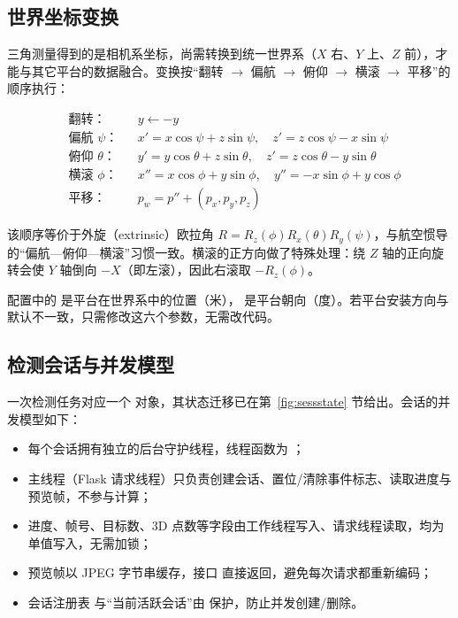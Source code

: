 \subsection{世界坐标变换}

三角测量得到的是相机系坐标，尚需转换到统一世界系（$X$ 右、$Y$ 上、$Z$ 前），才能与其它平台的数据融合。变换按“翻转 $\rightarrow$ 偏航 $\rightarrow$ 俯仰 $\rightarrow$ 横滚 $\rightarrow$ 平移”的顺序执行：

\begin{equation}
\begin{aligned}
&\text{翻转：} && y \leftarrow -y\\
&\text{偏航 } \psi\text{：} && x' = x\cos\psi + z\sin\psi,\quad z' = z\cos\psi - x\sin\psi\\
&\text{俯仰 } \theta\text{：} && y' = y\cos\theta + z\sin\theta,\quad z' = z\cos\theta - y\sin\theta\\
&\text{横滚 } \phi\text{：} && x'' = x\cos\phi + y\sin\phi,\quad y'' = -x\sin\phi + y\cos\phi\\
&\text{平移：} && p_w = p'' + (p_x,p_y,p_z)
\end{aligned}
\end{equation}

该顺序等价于外旋（extrinsic）欧拉角 $R=R_z(\phi)R_x(\theta)R_y(\psi)$，与航空惯导的“偏航—俯仰—横滚”习惯一致。横滚的正方向做了特殊处理：绕 $Z$ 轴的正向旋转会使 $Y$ 轴倒向 $-X$（即左滚），因此右滚取 $-R_z(\phi)$。

\begin{notebox}[坐标约定提示]
配置中的  是平台在世界系中的位置（米）， 是平台朝向（度）。若平台安装方向与默认不一致，只需修改这六个参数，无需改代码。
\end{notebox}

\subsection{检测会话与并发模型}

一次检测任务对应一个  对象，其状态迁移已在第~\ref{fig:sessstate} 节给出。会话的并发模型如下：

\begin{itemize}
  \item 每个会话拥有独立的后台守护线程，线程函数为 ；
  \item 主线程（Flask 请求线程）只负责创建会话、置位/清除事件标志、读取进度与预览帧，不参与计算；
  \item 进度、帧号、目标数、3D 点数等字段由工作线程写入、请求线程读取，均为单值写入，无需加锁；
  \item 预览帧以 JPEG 字节串缓存，接口  直接返回，避免每次请求都重新编码；
  \item 会话注册表  与“当前活跃会话”由  保护，防止并发创建/删除。
\end{itemize}

